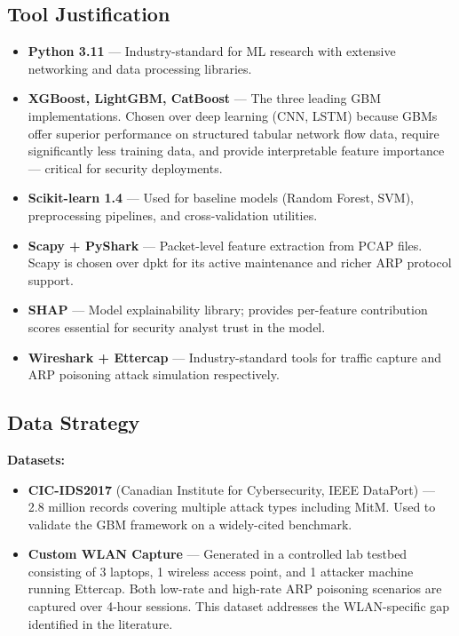 \documentclass[12pt,a4paper]{article}
\begin{document}
\subsection{Tool Justification}

\begin{itemize}[itemsep=4pt]
    \item \textbf{Python 3.11} --- Industry-standard for ML research with
          extensive networking and data processing libraries.
    \item \textbf{XGBoost, LightGBM, CatBoost} --- The three leading GBM
          implementations. Chosen over deep learning (CNN, LSTM) because GBMs
          offer superior performance on structured tabular network flow data,
          require significantly less training data, and provide interpretable
          feature importance --- critical for security deployments.
    \item \textbf{Scikit-learn 1.4} --- Used for baseline models (Random Forest,
          SVM), preprocessing pipelines, and cross-validation utilities.
    \item \textbf{Scapy + PyShark} --- Packet-level feature extraction from
          PCAP files. Scapy is chosen over dpkt for its active maintenance
          and richer ARP protocol support.
    \item \textbf{SHAP} --- Model explainability library; provides per-feature
          contribution scores essential for security analyst trust in the model.
    \item \textbf{Wireshark + Ettercap} --- Industry-standard tools for traffic
          capture and ARP poisoning attack simulation respectively.
\end{itemize}

\subsection{Data Strategy}

\textbf{Datasets:}
\begin{itemize}[itemsep=2pt]
    \item \textbf{CIC-IDS2017} (Canadian Institute for Cybersecurity, IEEE DataPort)
          --- 2.8 million records covering multiple attack types including MitM.
          Used to validate the GBM framework on a widely-cited benchmark.
    \item \textbf{Custom WLAN Capture} --- Generated in a controlled lab testbed
          consisting of 3 laptops, 1 wireless access point, and 1 attacker machine
          running Ettercap. Both low-rate and high-rate ARP poisoning scenarios
          are captured over 4-hour sessions. This dataset addresses the
          WLAN-specific gap identified in the literature.
\end{itemize}
\end{document}

